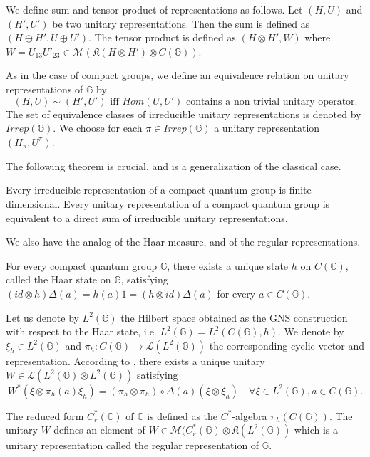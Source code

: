 We define sum and tensor product of representations as follows. Let $(H,U)$ and $(H',U')$ be two unitary representations. Then the sum is defined as $(H\oplus H', U\oplus U')$. The tensor product is defined as $(H\otimes H',W)$ where $W = U_{13} U'_{23}\in \mathcal M(\mathfrak K(H\otimes H')\otimes C(\mathbb G))$. 

\begin{definition}
As in the case of compact groups, we define an equivalence relation on unitary representations of $\mathbb G$ by 
\[(H,U)\sim (H',U') \text{ iff } Hom(U,U') \text{ contains a non trivial unitary operator}.\]
The set of equivalence classes of irreducible unitary representations is denoted by $Irrep(\mathbb G)$. We choose for each $\pi\in Irrep (\mathbb G)$ a unitary representation $(H_\pi, U^{\pi})$. 
\end{definition}

The following theorem is crucial, and is a generalization of the classical case. 

\begin{thm} Every irreducible representation of a compact quantum group is finite dimensional. Every unitary representation of a compact quantum group is equivalent to a direct sum of irreducible unitary representations. 
\end{thm}
 
We also have the analog of the Haar measure, and of the regular representations.

\begin{prop}
For every compact quantum group $\mathbb G$, there exists a unique state $h$ on $C(\mathbb G)$, called the Haar state on $\mathbb G$, satisfying $(id\otimes h)\Delta(a) = h(a)1 = (h\otimes id)\Delta(a)$ for every $a\in C(\mathbb G)$. 
\end{prop}

Let us denote by $L^2(\mathbb G)$ the Hilbert space obtained as the GNS construction with respect to the Haar state, i.e. $L^2(\mathbb G) = L^2(C(\mathbb G),h)$. We denote by $\xi_h\in L^2(\mathbb G)$ and $\pi_h : C(\mathbb G)\rightarrow \mathcal L(L^2(\mathbb G))$ the corresponding cyclic vector and representation. According to \cite{Wo}, there exists a unique unitary $W\in \mathcal L(L^2(\mathbb G) \otimes L^2(\mathbb G) )$ satisfying 
\[W^*(\xi\otimes \pi_h(a)\xi_h ) = (\pi_h\otimes\pi_h)\circ \Delta(a)(\xi\otimes \xi_h)\quad \forall \xi\in L^2(\mathbb G),a\in C(\mathbb G).\] 

\begin{definition}
The reduced form $C_r^*(\mathbb G)$ of $\mathbb G$ is defined as the $C^*$-algebra $\pi_h(C(\mathbb G))$. The unitary $W$ defines an element of $W\in\mathcal M(C_r^*(\mathbb G)\otimes \mathfrak K(L^2(\mathbb G))$ which is a unitary representation  called the regular representation of $\mathbb G$.
\end{definition}

